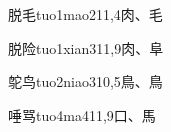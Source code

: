 \begin{entry}{脱毛}{tuo1mao2}{11,4}{⾁、⽑}
\end{entry}

\begin{entry}{脱险}{tuo1xian3}{11,9}{⾁、⾩}
\end{entry}

\begin{entry}{鸵鸟}{tuo2niao3}{10,5}{⿃、⿃}
\end{entry}

\begin{entry}{唾骂}{tuo4ma4}{11,9}{⼝、⾺}
\end{entry}


